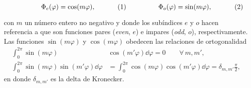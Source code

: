 	\begin{subequations}
	\eqhalf{\Phi_e(\varphi) = \cos(m\varphi),}
	\eqhalf{\Phi_o(\varphi) = \sin(m\varphi),}
	\label{eq:SinCos} 
	\end{subequations} \vspace{-.5em}
	
\noindent	
con $m$ un número entero no negativo y donde los subíndices $e$ y $o$ hacen referencia a que son funciones pares (\emph{even}, $e$) e impares (\emph{odd}, $o$), respectivamente. Las funciones $\sin(m\varphi)$ y $\cos(m\varphi)$ obedecen las relaciones de ortogonalidad
 	\begin{subequations}
	\begin{align}
	\int_0^{2\pi} \sin(m\varphi) &\cos(m' \varphi) \dd\varphi = 0 \qquad \forall\, m,m',\label{seq:ortSinCos}\\
	\int_0^{2\pi} \sin(m\varphi) \sin(m'\varphi)\dd\varphi &=  \int_0^{2\pi} \cos(m\varphi) \cos(m'\varphi)\dd\varphi  = \delta_{m,m'}\frac{\pi}{2},\label{seq:ortCos2}
	\end{align}\label{eq:ortSinCos}
 	\end{subequations}
en donde $\delta_{m,m'}$ es la delta de Kronecker.

